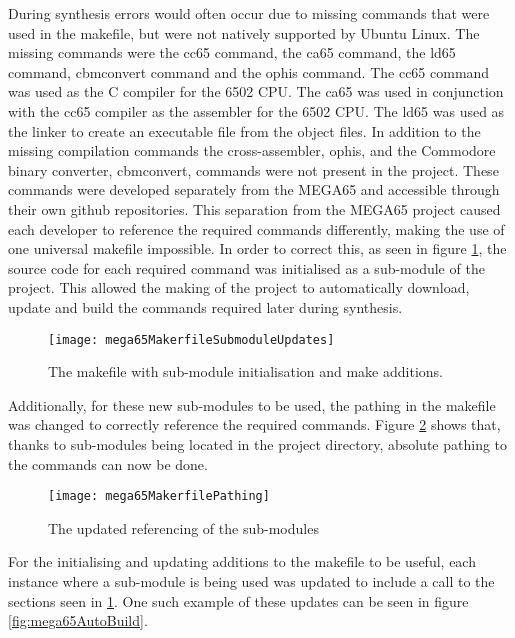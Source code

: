 \label{Ch4 Sec1 Sub1}

During synthesis errors would often occur due to missing commands that were used in the makefile, but were not natively supported by Ubuntu Linux. The missing commands were the cc65 command, the ca65 command, the ld65 command, cbmconvert command and the ophis command. The cc65 command was used as the C compiler for the 6502 CPU. The ca65 was used in conjunction with the cc65 compiler as the assembler for the 6502 CPU. The ld65 was used as the linker to create an executable file from the object files. In addition to the missing compilation commands the cross-assembler, ophis, and the Commodore binary converter, cbmconvert, commands were not present in the project. These commands were developed separately from the MEGA65 and accessible through their own github repositories. This separation from the MEGA65 project caused each developer to reference the required commands differently, making the use of one universal makefile impossible. In order to correct this, as seen in figure \ref{fig:mega65MakerfileSubmodulesUpdates}, the source code for each required command was initialised as a sub-module of the project. This allowed the making of the project to automatically download, update and build the commands required later during synthesis.\\

\begin{figure}
  \centering
  \texttt{[image: mega65MakerfileSubmoduleUpdates]}
  \caption{The makefile with sub-module initialisation and make additions.}
  \label{fig:mega65MakerfileSubmodulesUpdates}
\end{figure}

Additionally, for these new sub-modules to be used, the pathing in the makefile was changed to correctly reference the required commands. Figure \ref{fig:mega65MakerfilePathing} shows that, thanks to sub-modules being located in the project directory, absolute pathing to the commands can now be done.\\

\begin{figure}
  \centering
  \texttt{[image: mega65MakerfilePathing]}
  \caption{The updated referencing of the sub-modules}
  \label{fig:mega65MakerfilePathing}
\end{figure}

For the initialising and updating additions to the makefile to be useful, each instance where a sub-module is being used was updated to include a call to the sections seen in \ref{fig:mega65MakerfileSubmodulesUpdates}. One such example of these updates can be seen in figure \ref{fig:mega65AutoBuild}.\\

